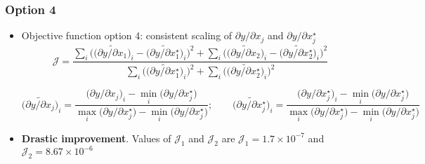 \begin{frame}
	\frametitle[]{Option 4  \hspace{8cm}}
	\footnotesize
	
	\vspace{0mm}
	
	\begin{itemize}
		\item Objective function option 4: consistent scaling of $\partial y/\partial x_j$ and $\partial y/\partial x_j^{\star}$
		\begin{equation*}
			\boxed{\mathcal{J}  =  \frac{\sum_i \Bigg(\Big(\widetilde{\partial y/\partial x_1}\Big)_i-\Big(\widetilde{\partial y/\partial x_1^{\star}}\Big)_i\Bigg)^2 + \sum_i \Bigg(\Big(\widetilde{\partial y/\partial x_2}\Big)_i-\Big(\widetilde{\partial y/\partial x_2^{\star}}\Big)_i\Bigg)^2}{\sum_i\Bigg(\Big(\widetilde{\partial y/\partial x_1^{\star}}\Big)_i\Bigg)^2 + \sum_i\Bigg(\Big(\widetilde{\partial y/\partial x_2^{\star}}\Big)_i\Bigg)^2}}
		\end{equation*}
		
		
		\begin{equation*}
			\Big(\widetilde{\partial y/\partial x_j}\Big)_i  =  \frac{\Big(\partial y/\partial x_j\Big)_i-\min_{i}\Big(\partial y/\partial x_j^{\star}\Big)}{\max_{i}\Big(\partial y/\partial x_j^{\star}\Big)-\min_{i}\Big(\partial y/\partial x_j^{\star}\Big)};\qquad
			\Big(\widetilde{\partial y/\partial x_j^{\star}}\Big)_i  =  \frac{\Big(\partial y/\partial x_j^{\star}\Big)_i-\min_{i}\Big(\partial y/\partial x_j^{\star}\Big)}{\max_{i}\Big(\partial y/\partial x_j^{\star}\Big)-\min_{i}\Big(\partial y/\partial x_j^{\star}\Big)}			
		\end{equation*}		
		
		\begin{center}
			
		\end{center}				
		
		\item \textcolor[rgb]{1.0,0.0,0.0}{\textbf{Drastic improvement}}. Values of $\mathcal{J}_1$	and $\mathcal{J}_2$ are $\mathcal{J}_1  =  1.7\times 10^{-7}$ and $\mathcal{J}_2=8.67\times 10^{-6}$

		
	\end{itemize}		
	
	
\end{frame}



